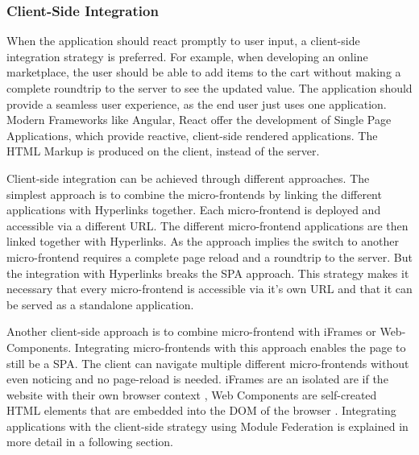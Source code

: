 \subsubsection{Client-Side Integration}\label{subsubsection:background:micro-frontend-architecture:integration-strategies:client-side-integration}

When the application should react promptly to user input, a client-side integration strategy is preferred. For example, when developing an online marketplace, the user should be able to add items to the cart without making a complete roundtrip to the server to see the updated value. The application should provide a seamless user experience, as the end user just uses one application. Modern Frameworks like Angular, React offer the development of Single Page Applications, which provide reactive, client-side rendered applications. The HTML Markup is produced on the client, instead of the server. \cite{book:2020:geers:background:micro-frontends:micro-frontends-in-action}

\bigskip

\noindent Client-side integration can be achieved through different approaches. The simplest approach is to combine the micro-frontends by linking the different applications with Hyperlinks together. Each micro-frontend is deployed and accessible via a different URL. The different micro-frontend applications are then linked together with Hyperlinks. As the approach implies the switch to another micro-frontend requires a complete page reload and a roundtrip to the server. But the integration with Hyperlinks breaks the SPA approach. This strategy makes it necessary that every micro-frontend is accessible via it's own URL and that it can be served as a standalone application.

\bigskip

\noindent Another client-side approach is to combine micro-frontend with iFrames or Web-Components. Integrating micro-frontends with this approach enables the page to still be a SPA. The client can navigate multiple different micro-frontends without even noticing and no page-reload is needed. iFrames are an isolated are if the website with their own browser context \cite[35]{book:2020:geers:background:micro-frontends:micro-frontends-in-action}, Web Components are self-created HTML elements that are embedded into the DOM of the browser \cite[103]{book:2019:farrell:background:micro-frontends:web-components-in-action}. Integrating applications with the client-side strategy using Module Federation is explained in more detail in a following section.
